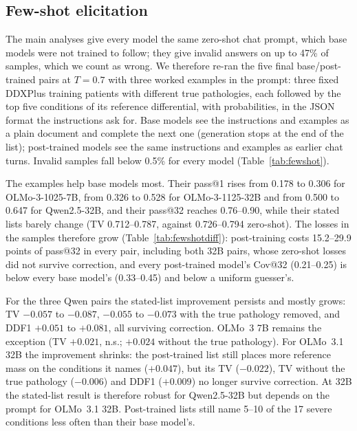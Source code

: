 \documentclass[11pt]{article}
\begin{document}
\begin{table}[t]
\label{tab:reversal}
\end{table}

\subsection{Few-shot elicitation}\label{sec:fewshot}
The main analyses give every model the same zero-shot chat prompt, which base models were not trained to follow; they give invalid answers on up to 47\% of samples, which we count as wrong. We therefore re-ran the five final base/post-trained pairs at $T{=}0.7$ with three worked examples in the prompt: three fixed DDXPlus training patients with different true pathologies, each followed by the top five conditions of its reference differential, with probabilities, in the JSON format the instructions ask for. Base models see the instructions and examples as a plain document and complete the next one (generation stops at the end of the list); post-trained models see the same instructions and examples as earlier chat turns. Invalid samples fall below 0.5\% for every model (Table~\ref{tab:fewshot}).

The examples help base models most. Their pass@1 rises from 0.178 to 0.306 for OLMo-3-1025-7B, from 0.326 to 0.528 for OLMo-3-1125-32B and from 0.500 to 0.647 for Qwen2.5-32B, and their pass@32 reaches 0.76--0.90, while their stated lists barely change (TV 0.712--0.787, against 0.726--0.794 zero-shot). The losses in the samples therefore grow (Table~\ref{tab:fewshotdiff}): post-training costs 15.2--29.9 points of pass@32 in every pair, including both 32B pairs, whose zero-shot losses did not survive correction, and every post-trained model's Cov@32 (0.21--0.25) is below every base model's (0.33--0.45) and below a uniform guesser's.

For the three Qwen pairs the stated-list improvement persists and mostly grows: TV $-0.057$ to $-0.087$, $-0.055$ to $-0.073$ with the true pathology removed, and DDF1 $+0.051$ to $+0.081$, all surviving correction. OLMo~3 7B remains the exception (TV $+0.021$, n.s.; $+0.024$ without the true pathology). For OLMo~3.1 32B the improvement shrinks: the post-trained list still places more reference mass on the conditions it names ($+0.047$), but its TV ($-0.022$), TV without the true pathology ($-0.006$) and DDF1 ($+0.009$) no longer survive correction. At 32B the stated-list result is therefore robust for Qwen2.5-32B but depends on the prompt for OLMo~3.1 32B. Post-trained lists still name 5--10 of the 17 severe conditions less often than their base model's.
\end{document}
